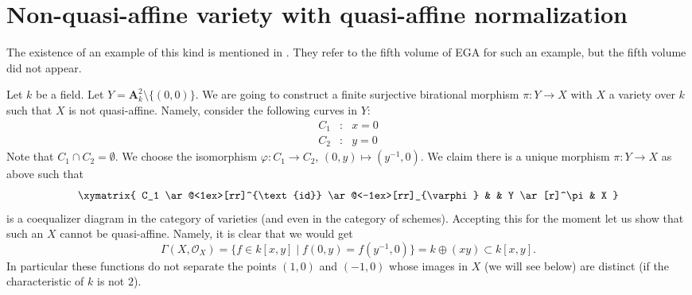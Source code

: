 \section{Non-quasi-affine variety with quasi-affine normalization}
\label{section-nonquasi-affine}

\noindent
The existence of an example of this kind is mentioned in
\cite[II Remark 6.6.13]{EGA}. They refer to the fifth volume of
EGA for such an example, but the fifth volume did not appear.

\medskip\noindent
Let $k$ be a field.
Let $Y = \mathbf{A}^2_k \setminus \{(0, 0)\}$.
We are going to construct a finite surjective birational morphism
$\pi : Y \longrightarrow X$
with $X$ a variety over $k$ such that $X$ is not quasi-affine.
Namely, consider the following curves in $Y$:
$$
\begin{matrix}
C_1 & : & x = 0 \\
C_2 & : & y = 0
\end{matrix}
$$
Note that $C_1 \cap C_2 = \emptyset$. We choose the isomorphism
$\varphi : C_1 \to C_2$, $(0, y) \mapsto (y^{-1}, 0)$.
We claim there is a unique morphism $\pi : Y \to X$ as above
such that
$$
\xymatrix{
C_1
\ar@<1ex>[rr]^{\text{id}} \ar@<-1ex>[rr]_{\varphi}
& &
Y \ar[r]^\pi & X
}
$$
is a coequalizer diagram in the category of varieties (and even in
the category of schemes). Accepting this for the moment let us
show that such an $X$ cannot be quasi-affine. Namely, it is clear
that we would get
$$
\Gamma(X, \mathcal{O}_X) =
\{ f \in k[x, y] \mid f(0, y) = f(y^{-1}, 0)\} =
k \oplus (xy) \subset k[x, y].
$$
In particular these functions do not separate the points $(1, 0)$
and $(-1, 0)$ whose images in $X$ (we will see below) are distinct
(if the characteristic of $k$ is not $2$).

